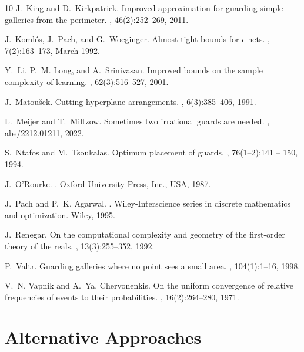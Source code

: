 \documentclass[a4paper,11pt]{article}
\begin{document}
\begin{thebibliography}{10}
	J.~King and D.~Kirkpatrick.
	\newblock Improved approximation for guarding simple galleries from the
	perimeter.
	, 46(2):252--269, 2011.
	
	J.~Koml\'{o}s, J.~Pach, and G.~Woeginger.
	\newblock Almost tight bounds for $\epsilon$-nets.
	, 7(2):163--173, March 1992.
	
	Y.~Li, P.~M. Long, and A.~Srinivasan.
	\newblock Improved bounds on the sample complexity of learning.
	, 62(3):516--527, 2001.
	
	J.~Matou{\v{s}}ek.
	\newblock Cutting hyperplane arrangements.
	, 6(3):385--406, 1991.
	
	L.~Meijer and T.~Miltzow.
	\newblock Sometimes two irrational guards are needed.
	, abs/2212.01211, 2022.
	
	S.~Ntafos and M.~Tsoukalas.
	\newblock Optimum placement of guards.
	, 76(1–2):141 -- 150, 1994.
	
	J.~O'Rourke.
	.
	\newblock Oxford University Press, Inc., USA, 1987.
	
	J.~Pach and P.~K. Agarwal.
	.
	\newblock Wiley-Interscience series in discrete mathematics and optimization.
	Wiley, 1995.
	
	J.~Renegar.
	\newblock On the computational complexity and geometry of the first-order
	theory of the reals.
	, 13(3):255--352, 1992.
	
	P.~Valtr.
	\newblock Guarding galleries where no point sees a small area.
	, 104(1):1--16, 1998.
	
	V.~N. Vapnik and A.~Ya. Chervonenkis.
	\newblock On the uniform convergence of relative frequencies of events to their
	probabilities.
	, 16(2):264--280,
	1971.
	
\end{thebibliography}

\section{Alternative Approaches}\label{alt}
\end{document}
